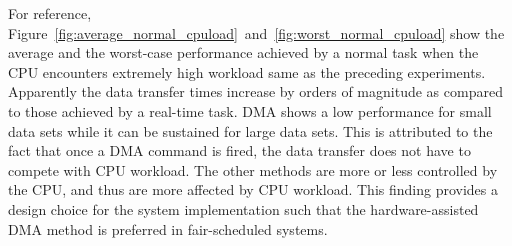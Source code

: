 For reference,
Figure~\ref{fig:average_normal_cpuload}~and~\ref{fig:worst_normal_cpuload}
show the average and the worst-case performance achieved by a normal
task when the CPU encounters extremely high workload same as the
preceding experiments.
Apparently the data transfer times increase by orders of magnitude as
compared to those achieved by a real-time task.
\textsf{DMA} shows a low performance for small data sets while it can be
sustained for large data sets.
This is attributed to the fact that once a DMA command is fired, the
data transfer does not have to compete with CPU workload.
The other methods are more or less controlled by the CPU, and thus are
more affected by CPU workload.
This finding provides a design choice for the system implementation such
that the hardware-assisted DMA method is preferred in fair-scheduled
systems.

